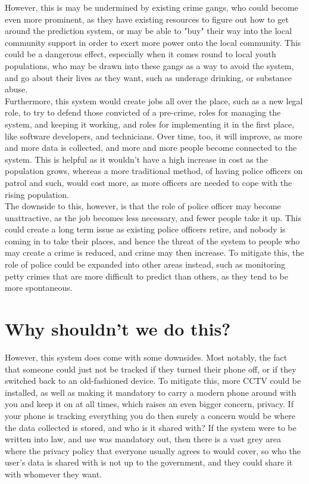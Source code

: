 \documentclass[12pt]{amsart}
\begin{document}
    However, this is may be undermined by existing crime gangs, who could become even more prominent, as they have
    existing resources to figure out how to get around the prediction system, or may be able to "buy" their way into
    the local community support in order to exert more power onto the local community.
    This could be a dangerous effect, especially when it comes round to local youth populations, who may be drawn into
    these gangs as a way to avoid the system, and go about their lives as they want, such as underage drinking, or
    substance abuse.
    \\

    Furthermore, this system would create jobs all over the place, such as a new legal role, to try to defend those
    convicted of a pre-crime, roles for managing the system, and keeping it working, and roles for implementing it in
    the first place, like software developers, and technicians.
    Over time, too, it will improve, as more and more data is collected, and more and more people become connected to
    the system.
    This is helpful as it wouldn't have a high increase in cost as the population grows, whereas a more traditional
    method, of having police officers on patrol and such, would cost more, as more officers are needed to cope with
    the rising population.
    \\

    The downside to this, however, is that the role of police officer may become unattractive, as the job becomes less
    necessary, and fewer people take it up.
    This could create a long term issue as existing police officers retire, and nobody is coming in to take
    their places, and hence the threat of the system to people who may create a crime is reduced, and crime may then
    increase.
    To mitigate this, the role of police could be expanded into other areas instead, such as monitoring petty crimes
    that are more difficult to predict than others, as they tend to be more spontaneous.

    \section{Why shouldn't we do this?}\label{sec:why-shouldn't-we-do-this?}

    However, this system does come with some downsides.
    Most notably, the fact that someone could just not be tracked if they turned their phone off, or if they switched
    back to an old-fashioned device.
    To mitigate this, more CCTV could be installed, as well as making it mandatory to carry a modern phone around with
    you and keep it on at all times, which raises an even bigger concern, privacy.
    If your phone is tracking everything you do then surely a concern would be where the data collected is stored, and
    who is it shared with?
    If the system were to be written into law, and use was mandatory out, then there is a vast grey area where the
    privacy policy that everyone usually agrees to would cover, so who the user's data is shared with is not up to the
    government, and they could share it with whomever they want.
    \\
\end{document}
